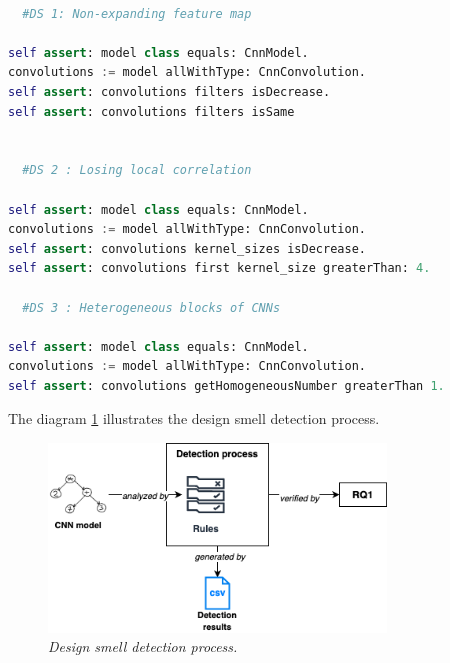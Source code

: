 \begin{lstlisting}[language=Python, caption=\emph{Rules examples for detecting design smells in CNN programs.}\\, label=lst:rules]

  #DS 1: Non-expanding feature map

self assert: model class equals: CnnModel.
convolutions := model allWithType: CnnConvolution.
self assert: convolutions filters isDecrease.
self assert: convolutions filters isSame


  #DS 2 : Losing local correlation

self assert: model class equals: CnnModel.
convolutions := model allWithType: CnnConvolution.
self assert: convolutions kernel_sizes isDecrease.
self assert: convolutions first kernel_size greaterThan: 4.

  #DS 3 : Heterogeneous blocks of CNNs

self assert: model class equals: CnnModel.
convolutions := model allWithType: CnnConvolution.
self assert: convolutions getHomogeneousNumber greaterThan 1.

\end{lstlisting}



The diagram \ref{fig:detection} illustrates the design smell detection process.\\


\begin{figure}[h!]
  \centering
  \includegraphics[width=0.8\textwidth]{figure/design_smell_detection.png}
  \caption{\emph{Design smell detection process.}}
  \label{fig:detection}
\end{figure}

